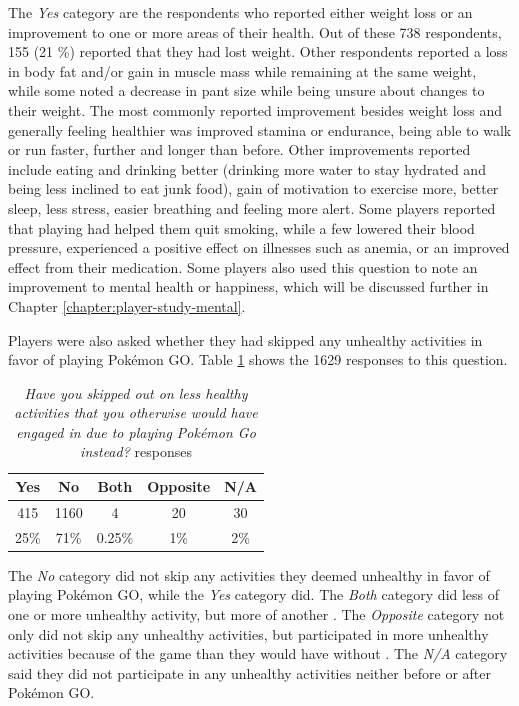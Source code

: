 The \emph{Yes} category are the respondents who reported either weight loss or an improvement to one or more areas of their health. Out of these 738 respondents, 155 (21 \%) reported that they had lost weight. Other respondents reported a loss in body fat and/or gain in muscle mass while remaining at the same weight, while some noted a decrease in pant size while being unsure about changes to their weight. The most commonly reported improvement besides weight loss and generally feeling healthier was improved stamina or endurance, being able to walk or run faster, further and longer than before. Other improvements reported include eating and drinking better (drinking more water to stay hydrated and being less inclined to eat junk food), gain of motivation to exercise more, better sleep, less stress, easier breathing and feeling more alert. Some players reported that playing had helped them quit smoking, while a few lowered their blood pressure, experienced a positive effect on illnesses such as anemia, or an improved effect from their medication. Some players also used this question to note an improvement to mental health or happiness, which will be discussed further in Chapter \ref{chapter:player-study-mental}.

Players were also asked whether they had skipped any unhealthy activities in favor of playing Pokémon GO. Table \ref{tbl:skipping-unhealthy-activities} shows the 1629 responses to this question.

\begin{table}[h]
	\centering
	\caption{\emph{Have you skipped out on less healthy activities that you otherwise would have engaged in due to playing Pokémon Go instead?} responses}
	\label{tbl:skipping-unhealthy-activities}
	\begin{tabular}{|c|c|c|c|c|}
		\hline
		\textbf{Yes} & \textbf{No} & \textbf{Both} & \textbf{Opposite} & \textbf{N/A}\\
		\hline\hline
		415		& 1160	& 4		& 20	& 30\\
		25\%	& 71\%	& 0.25\%& 1\%	& 2\%\\\hline
	\end{tabular}
\end{table}

The \emph{No} category did not skip any activities they deemed unhealthy in favor of playing Pokémon GO, while the \emph{Yes} category did. The \emph{Both} category did less of one or more unhealthy activity, but more of another . The \emph{Opposite} category not only did not skip any unhealthy activities, but participated in more unhealthy activities because of the game than they would have without . The \emph{N/A} category said they did not participate in any unhealthy activities neither before or after Pokémon GO.

